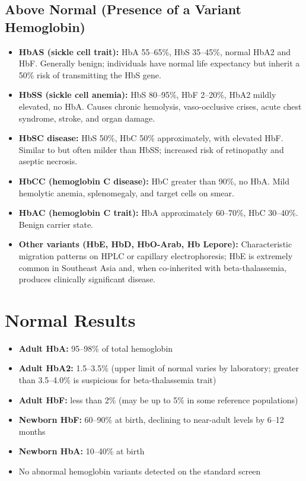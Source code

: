 \subsection*{Above Normal (Presence of a Variant Hemoglobin)}
\begin{itemize}
  \item \textbf{HbAS (sickle cell trait):} HbA 55--65\%, HbS 35--45\%, normal HbA2 and HbF. Generally benign; individuals have normal life expectancy but inherit a 50\% risk of transmitting the HbS gene.
  \item \textbf{HbSS (sickle cell anemia):} HbS 80--95\%, HbF 2--20\%, HbA2 mildly elevated, no HbA. Causes chronic hemolysis, vaso-occlusive crises, acute chest syndrome, stroke, and organ damage.
  \item \textbf{HbSC disease:} HbS 50\%, HbC 50\% approximately, with elevated HbF. Similar to but often milder than HbSS; increased risk of retinopathy and aseptic necrosis.
  \item \textbf{HbCC (hemoglobin C disease):} HbC greater than 90\%, no HbA. Mild hemolytic anemia, splenomegaly, and target cells on smear.
  \item \textbf{HbAC (hemoglobin C trait):} HbA approximately 60--70\%, HbC 30--40\%. Benign carrier state.
  \item \textbf{Other variants (HbE, HbD, HbO-Arab, Hb Lepore):} Characteristic migration patterns on HPLC or capillary electrophoresis; HbE is extremely common in Southeast Asia and, when co-inherited with beta-thalassemia, produces clinically significant disease.
\end{itemize}

\section*{Normal Results}
\begin{itemize}
  \item \textbf{Adult HbA:} 95--98\% of total hemoglobin
  \item \textbf{Adult HbA2:} 1.5--3.5\% (upper limit of normal varies by laboratory; greater than 3.5--4.0\% is suspicious for beta-thalassemia trait)
  \item \textbf{Adult HbF:} less than 2\% (may be up to 5\% in some reference populations)
  \item \textbf{Newborn HbF:} 60--90\% at birth, declining to near-adult levels by 6--12 months
  \item \textbf{Newborn HbA:} 10--40\% at birth
  \item No abnormal hemoglobin variants detected on the standard screen
\end{itemize}

